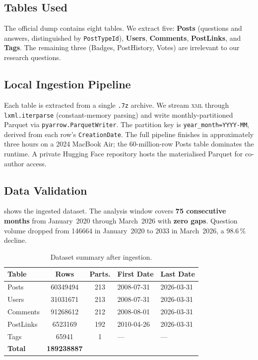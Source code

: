 \documentclass[sigconf]{acmart}
\begin{document}
\subsection{Tables Used}

The official dump contains eight tables.
We extract five:
\textbf{Posts} (questions and answers,
distinguished by \texttt{PostTypeId}),
\textbf{Users}, \textbf{Comments},
\textbf{PostLinks}, and \textbf{Tags}.
The remaining three (Badges,
PostHistory, Votes) are irrelevant
to our research questions.

\subsection{Local Ingestion Pipeline}

Each table is extracted from a single
\texttt{.7z} archive.
We stream \textsc{xml} through
\texttt{lxml.iterparse}
(constant-memory parsing)
and write monthly-partitioned Parquet
via \texttt{pyarrow.ParquetWriter}.
The partition key is
\texttt{year\_month=YYYY-MM},
derived from each row's \texttt{CreationDate}.
The full pipeline finishes
in approximately three hours
on a 2024 MacBook Air;
the 60-million-row Posts table
dominates the runtime.
A private Hugging Face repository
hosts the materialised Parquet
for co-author access.

\subsection{Data Validation}

 shows
the ingested dataset.
The analysis window covers
\textbf{75 consecutive months}
from January~2020 through March~2026
with \textbf{zero gaps}.
Question volume dropped
from \num{146664} in January~2020
to \num{2033} in March~2026,
a 98.6\,\% decline.

\begin{table}[t]
  \caption{Dataset summary after ingestion.}
  \label{tab:data-summary}
  \centering
  \begin{tabular}{l
    S[table-format=11.0]
    S[table-format=3.0]
    ll}
    \toprule
    Table & {Rows} & {Parts.}
      & {First Date} & {Last Date} \\
    \midrule
    Posts     & 60349494 & 213
      & 2008-07-31 & 2026-03-31 \\
    Users     & 31031671 & 213
      & 2008-07-31 & 2026-03-31 \\
    Comments  & 91268612 & 212
      & 2008-08-01 & 2026-03-31 \\
    PostLinks &  6523169 & 192
      & 2010-04-26 & 2026-03-31 \\
    Tags      &    65941 &   1
      & {---} & {---} \\
    \midrule
    \textbf{Total}
      & \textbf{189238887} & & & \\
    \bottomrule
  \end{tabular}
\end{table}
\end{document}
